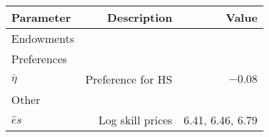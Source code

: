 \begin{tabular}{lrr}
\hline
Parameter & Description  & Value  \\ 
\hline
Endowments &   &   \\ 
Preferences &   &   \\ 
$\bar{\eta}$ & Preference for HS  & $-0.08$  \\ 
Other &   &   \\ 
$\hat{e}{s}$ & Log skill prices  & 6.41, 6.46, 6.79  \\ 
\hline
\end{tabular}%
